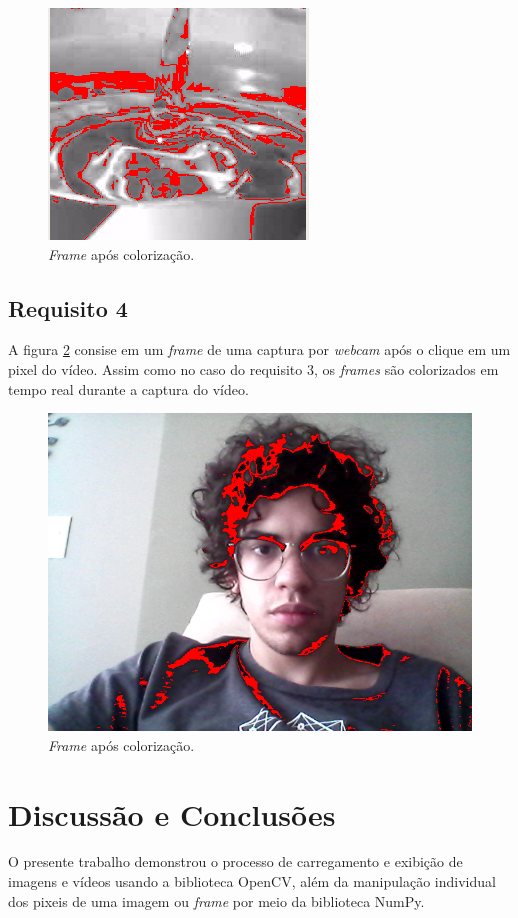 \documentclass{bmvc2k}
\begin{document}
\begin{figure}[!htb]
  \centering
  \includegraphics[width=0.5\linewidth]{Figs/red_drop.png}
  \caption{\textit{Frame} após colorização.}
  \label{fig:red_drop}
\end{figure}

\subsection{Requisito 4}
A figura \ref{fig:red_me} consise em um \textit{frame} de uma captura por \textit{webcam} após o clique em um pixel do vídeo. Assim como no caso do requisito 3, os \textit{frames} são colorizados em tempo real durante a captura do vídeo. 

\begin{figure}[!htb]
  \centering
  \includegraphics[width=0.5\linewidth]{Figs/red_me.png}
  \caption{\textit{Frame} após colorização.}
  \label{fig:red_me}
\end{figure}

\section{Discussão e Conclusões}
\label{sec:disc}
O presente trabalho demonstrou o processo de carregamento e exibição de imagens e vídeos usando a biblioteca OpenCV, além da manipulação individual dos pixeis de uma imagem ou \textit{frame} por meio da biblioteca NumPy.
\end{document}
